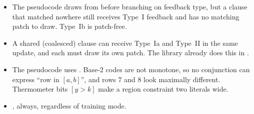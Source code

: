 \begin{itemize}[leftmargin=1.2em]
\item {} The pseudocode draws  from
   before branching on feedback type, but a clause that matched
  nowhere still receives Type~I feedback and has no matching patch to draw. Type~Ib is
  patch-free.
\item {} A shared (coalesced) clause can
  receive Type~Ia and Type~II in the same update, and each must draw its own patch. The
  library already does this in .
\item {} The pseudocode uses
  . Base-2 codes are not monotone, so no conjunction can express
  ``row in $[a,b]$'', and rows 7 and 8 look maximally different. Thermometer bits
  $[y > k]$ make a region constraint two literals wide.
\item {}, always, regardless of training mode.
\end{itemize}
